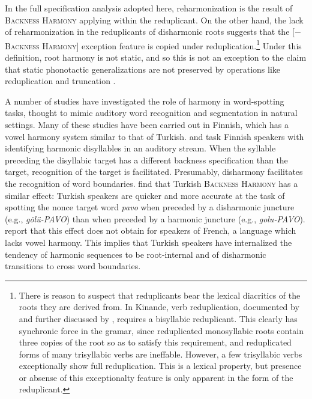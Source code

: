 \noindent 
In the full specification analysis adopted here, reharmonization is the result of \textsc{Backness Harmony} applying within the reduplicant. 
    On the other hand, the lack of reharmonization in the reduplicants of disharmonic roots suggests that the [$-$\textsc{Backness Harmony}] exception feature is copied under reduplication.\footnote{
    There is reason to suspect that reduplicants bear the lexical diacritics of the roots they are derived from.
    In Kinande, verb reduplication, documented by \citet{Mutaka1990} and further discussed by \citet{Downing2000}, requires a bisyllabic reduplicant. 
    This clearly has synchronic force in the gramar, since reduplicated monosyllabic roots contain three copies of the root so as to satisfy this requirement, and reduplicated forms of many trisyllabic verbs are ineffable. 
    However, a few trisyllabic verbs exceptionally show full reduplication.
    This is a lexical property, but presence or absense of this exceptionalty feature is only apparent in the form of the reduplicant.}
    Under this definition, root harmony is not static, and so this is not an exception to the claim that static phonotactic generalizations are not preserved by operations like reduplication and truncation \citep{Silverman2000}.

A number of studies have investigated the role of harmony in word-spotting tasks, thought to mimic auditory word recognition and segmentation in natural settings. 
    Many of these studies have been carried out in Finnish, which has a vowel harmony system similar to that of Turkish. 
    \citet{Suomi1997} and \citet{Vroomen1998} task Finnish speakers with identifying harmonic disyllables in an auditory stream. 
    When the syllable preceding the disyllabic target has a different backness specification than the target, recognition of the target is facilitated. Presumably, disharmony facilitates the recognition of word boundaries. 
    \citet{Kabak2010} find that Turkish \textsc{Backness Harmony} has a similar effect: Turkish speakers are quicker and more accurate at the task of spotting the nonce target word \emph{pavo} when preceded by a disharmonic juncture (e.g., \emph{gölü-PAVO}) than when preceded by a harmonic juncture (e.g., \emph{golu-PAVO}). 
    \citeauthor{Kabak2010} report that this effect does not obtain for speakers of French, a language which lacks vowel harmony. 
    This implies that Turkish speakers have internalized the tendency of harmonic sequences to be root-internal and of disharmonic transitions to cross word boundaries. 


